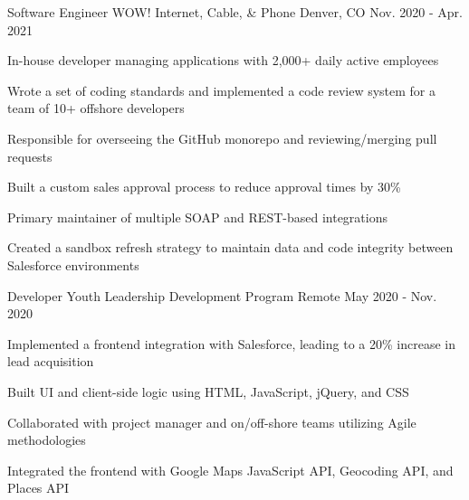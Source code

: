 \begin{cventries}
  \cventry
    {Software Engineer} %
    {WOW! Internet, Cable, \& Phone} %
    {Denver, CO} %
    {Nov. 2020 - Apr. 2021} %
    {
      \begin{cvitems} %
        \item {In-house developer managing applications with 2,000+ daily active employees}
        \item {Wrote a set of coding standards and implemented a code review system for a team of 10+ offshore developers}
        \item {Responsible for overseeing the GitHub monorepo and reviewing/merging pull requests}
        \item {Built a custom sales approval process to reduce approval times by 30\%}
        \item {Primary maintainer of multiple SOAP and REST-based integrations}
        \item {Created a sandbox refresh strategy to maintain data and code integrity between Salesforce environments}
      \end{cvitems}
    }

  \cventry
    {Developer} %
    {Youth Leadership Development Program} %
    {Remote} %
    {May 2020 - Nov. 2020} %
    {
      \begin{cvitems} %
        \item {Implemented a frontend integration with Salesforce, leading to a 20\% increase in lead acquisition}
        \item {Built UI and client-side logic using HTML, JavaScript, jQuery, and CSS}
        \item {Collaborated with project manager and on/off-shore teams utilizing Agile methodologies}
        \item {Integrated the frontend with Google Maps JavaScript API, Geocoding API, and Places API}
      \end{cvitems}
    }

\end{cventries}
